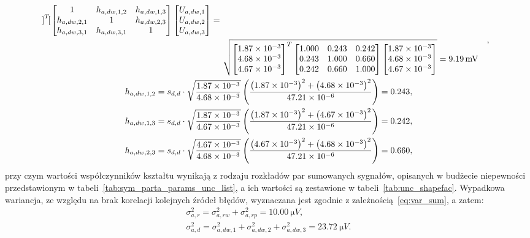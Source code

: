 \begin{gather}
\begin{split}
{\begin{bmatrix}
\end{bmatrix}^{T}
\begin{bmatrix}
1            & h_{a,dw,1,2} & h_{a,dw,1,3} \\
h_{a,dw,2,1} & 1            & h_{a,dw,2,3} \\
h_{a,dw,3,1} & h_{a,dw,3,1} & 1                 \\
\end{bmatrix}
\begin{bmatrix}
U_{a,dw,1} \\ U_{a,dw,2} \\ U_{a,dw,3}
\end{bmatrix}} = ~ \\ & \sqrt{
\begin{bmatrix}
\num{1.87e-3} \\ \num{4.68e-3} \\ \num{4.67e-3}
\end{bmatrix}^{T}
\begin{bmatrix}
1.000 & 0.243 & 0.242 \\
0.243 & 1.000 & 0.660 \\
0.242 & 0.660 & 1.000 \\
\end{bmatrix}
\begin{bmatrix}
\num{1.87e-3} \\ \num{4.68e-3} \\ \num{4.67e-3}
\end{bmatrix}} = \qty{9.19}{mV}
\end{split}
\label{eq:sym_parta_uncert_dyn}, \\
h_{a,dw,1,2} = s_{d,d} \cdot \sqrt{\frac{\num{1.87e-3}}{\num{4.68e-3}}} \left( \frac{\left(\num{1.87e-3}\right)^{2} + \left(\num{4.68e-3}\right)^{2}}{\num{47.21e-6}} \right) = 0.243 \label{eq:sym_parta_coher_dw_1_2}, \\
h_{a,dw,1,3} = s_{d,d} \cdot \sqrt{\frac{\num{1.87e-3}}{\num{4.67e-3}}} \left( \frac{\left(\num{1.87e-3}\right)^{2} + \left(\num{4.67e-3}\right)^{2}}{\num{47.21e-6}} \right) = 0.242 \label{eq:sym_parta_coher_dw_1_3}, \\
h_{a,dw,2,3} = s_{d,d} \cdot \sqrt{\frac{\num{4.67e-3}}{\num{4.68e-3}}} \left( \frac{\left(\num{4.67e-3}\right)^{2} + \left(\num{4.68e-3}\right)^{2}}{\num{47.21e-6}} \right) = 0.660 \label{eq:sym_parta_coher_dw_2_3},
\end{gather}
przy czym wartości współczynników kształtu wynikają z rodzaju rozkładów par sumowanych sygnałów, opisanych w budżecie niepewności przedstawionym w tabeli~\ref{tab:sym_parta_params_unc_list}, a ich wartości są zestawione w tabeli~\ref{tab:unc_shapefac}. Wypadkowa wariancja, ze względu na brak korelacji kolejnych źródeł błędów, wyznaczana jest zgodnie z zależnością~\eqref{eq:var_sum}, a zatem:
\begin{gather}
\sigma_{a,r}^{2} = \sigma_{a,rw}^{2} + \sigma_{a,rp}^{2} = \qty{10.00}{\micro V} \label{eq:sym_parta_var_rand}, \\
\sigma_{a,d}^{2} = \sigma_{a,dw,1}^{2} + \sigma_{a,dw,2}^{2} + \sigma_{a,dw,3}^{2} = \qty{23.72}{\micro V} \label{eq:sym_parta_var_dyn}.
\end{gather}

